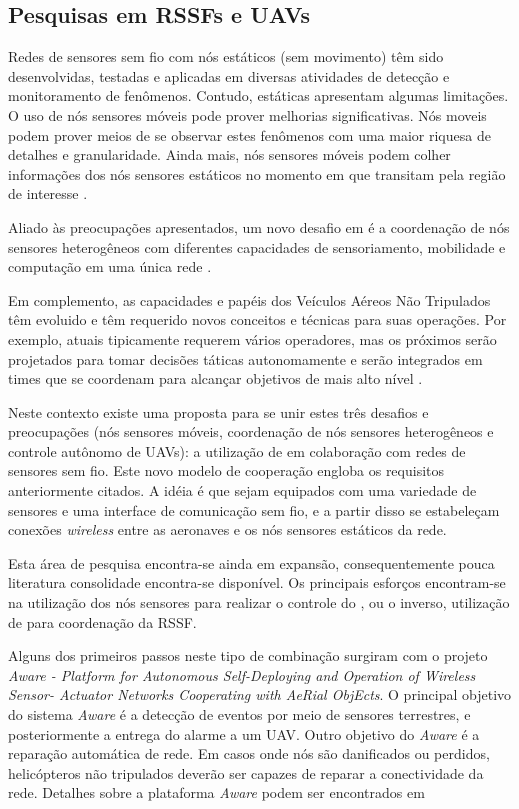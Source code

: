 \subsection{Pesquisas em RSSFs e UAVs}

Redes de sensores sem fio com nós estáticos (sem movimento) têm sido desenvolvidas, testadas e aplicadas em diversas atividades de detecção e monitoramento de fenômenos.
Contudo, \rssfs estáticas apresentam algumas limitações. O uso de nós sensores móveis pode prover melhorias significativas. Nós moveis podem prover meios de se observar estes fenômenos
com uma maior riquesa de detalhes e granularidade. Ainda mais, nós sensores móveis podem colher informações dos nós sensores estáticos no momento em que transitam
 pela região de interesse \cite{Aware}. 

Aliado às preocupações apresentados, um novo desafio em \rssfs é a coordenação de nós sensores heterogêneos com diferentes capacidades de sensoriamento, mobilidade e computação em uma única rede \cite{Freitas2009}. 

Em complemento, as capacidades e papéis dos Veículos Aéreos Não Tripulados têm evoluido e têm requerido novos conceitos e técnicas para suas operações. Por exemplo, \vants atuais tipicamente requerem vários operadores, mas os próximos \vants serão projetados para tomar decisões táticas autonomamente e serão integrados em times que se coordenam para alcançar objetivos de mais alto nível \cite{Richards2002, Mehdi2003}. 

Neste contexto existe uma proposta para se unir estes três desafios e preocupações (nós sensores móveis, coordenação de nós sensores heterogêneos e controle autônomo de UAVs): a utilização de \uavs em colaboração com redes de sensores sem fio. Este novo modelo de cooperação engloba os requisitos anteriormente citados. A idéia é que \vants sejam equipados com uma variedade de sensores e uma interface de comunicação sem fio, e a partir disso se estabeleçam conexões \emph{wireless} entre as aeronaves e os nós sensores estáticos da rede. 

Esta área de pesquisa encontra-se ainda em expansão, consequentemente pouca literatura consolidade encontra-se disponível. Os principais esforços encontram-se na utilização dos nós sensores para realizar o controle do \vant, ou o inverso, utilização de \vants para coordenação da RSSF.


Alguns dos primeiros passos neste tipo de combinação surgiram com o projeto \emph{Aware - Platform for Autonomous Self-Deploying and Operation of Wireless Sensor-
Actuator Networks Cooperating with AeRial ObjEcts}. O principal objetivo do sistema \emph{Aware} é a detecção de eventos por meio de sensores terrestres, e posteriormente a entrega do alarme a um UAV. Outro objetivo do \emph{Aware} é a reparação automática de rede. Em casos onde nós são danificados ou perdidos, helicópteros não tripulados deverão ser capazes de reparar a conectividade da rede. Detalhes sobre a plataforma \emph{Aware} podem ser encontrados em \cite{Aware, Aware2}


